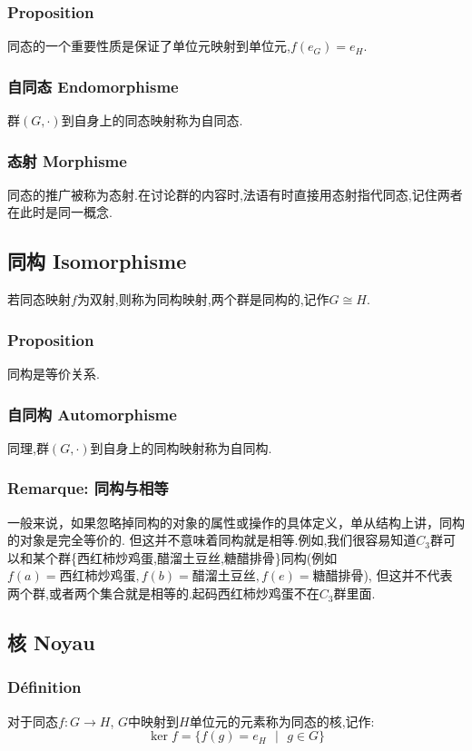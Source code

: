 \documentclass[12pt, a4paper, oneside]{ctexbook}
\begin{document}
  \subsubsection{Proposition}
  同态的一个重要性质是保证了单位元映射到单位元,$f(e_G)=e_H$.
  \subsubsection{自同态 Endomorphisme}
  群$(G,\cdot)$到自身上的同态映射称为自同态.
  \subsubsection{态射 Morphisme}
  同态的推广被称为态射.在讨论群的内容时,法语有时直接用态射指代同态,记住两者在此时是同一概念.
  \subsection{同构 Isomorphisme}    \label{myref:同构}
  若同态映射$f$为双射,则称为同构映射,两个群是同构的,记作$G\cong H$.
  \subsubsection{Proposition}
  同构是等价关系.

  \subsubsection{自同构 Automorphisme}
  同理,群$(G,\cdot)$到自身上的同构映射称为自同构.
  \subsubsection{Remarque: 同构与相等}
  一般来说，如果忽略掉同构的对象的属性或操作的具体定义，单从结构上讲，同构的对象是完全等价的.
  但这并不意味着同构就是相等.例如,我们很容易知道$C_3$群可以和某个群\{西红柿炒鸡蛋,醋溜土豆丝,糖醋排骨\}同构(例如
  $f(a)=\text{西红柿炒鸡蛋},f(b)=\text{醋溜土豆丝},f(e)=\text{糖醋排骨}$),
  但这并不代表两个群,或者两个集合就是相等的.起码西红柿炒鸡蛋不在$C_3$群里面.

  \subsection{核 Noyau}
  \subsubsection{Définition}
  对于同态$f:G\rightarrow H $, $G$中映射到$H$单位元的元素称为同态的核,记作:
  $$
  \ker f=\{f(g)=e_H\text{ }|\text{ }g\in G  \}
  $$
\end{document}
